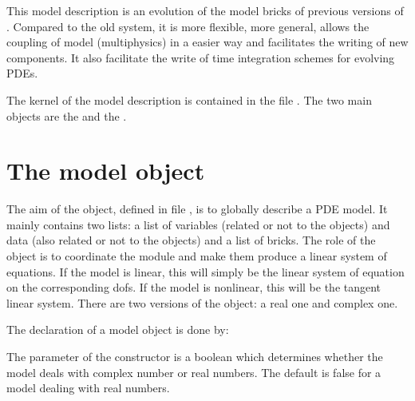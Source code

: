 \documentclass[a4paper,11pt,english]{sphinxmanual}
\begin{document}
This model description is an evolution of the model bricks of previous versions of
. Compared to the old system, it is more flexible, more general, allows the
coupling of model (multiphysics) in a easier way and facilitates the writing of new
components. It also facilitate the write of time integration schemes for evolving
PDEs.

The kernel of the model description is contained in the file
. The two main objects are the  and the .

\ignorespaces 

\section{The model object}
\label{\detokenize{userdoc/model_object:the-model-object}}\label{\detokenize{userdoc/model_object:ud-model-object}}\label{\detokenize{userdoc/model_object:index-0}}\label{\detokenize{userdoc/model_object::doc}}
The aim of the  object, defined in file , is to
globally describe a PDE model. It mainly contains two lists: a list of variables
(related or not to the  objects) and data (also related or not to the 
objects) and a list of bricks. The role of the  object is to coordinate the
module and make them produce a linear system of equations. If the model is
linear, this will simply be the linear system of equation on the corresponding
dofs. If the model is nonlinear, this will be the tangent linear system. There are two versions of the  object: a real one and complex one.

The declaration of a model object is done by:

\begin{sphinxVerbatim}[commandchars=\\\{\}]
   
\end{sphinxVerbatim}

The parameter of the constructor is a boolean which determines whether the model deals with
complex number or real numbers. The default is false for a model dealing with real
numbers.
\end{document}
